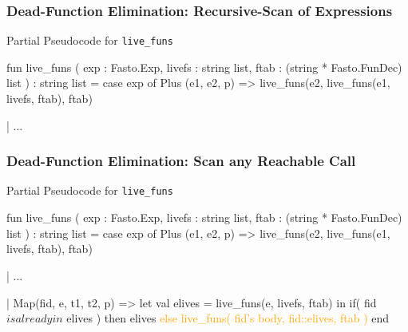 \documentclass{beamer}
\newcommand{\orange}[1]{\textcolor{Orange}{{#1}}}
\renewcommand{\emph}[1]{\textcolor{structure}{#1}}
\newcommand{\emp}[1]{\textcolor{DikuRed}{ #1}}
\newcommand{\mymath}[1]{$ #1 $}
\begin{document}
\begin{frame}[fragile,t]
    \frametitle{Dead-Function Elimination: Recursive-Scan of Expressions}

\begin{block}{Partial Pseudocode for {\tt live\_funs}}
\begin{colorcode}[fontsize=\scriptsize]
fun live_funs (
          exp    : Fasto.Exp,
          livefs : string list,
          ftab   : (string * Fasto.FunDec) list
    ) : string list =
  case exp of
    Plus (e1, e2, p) =>
        \emph{live_funs(e2, live_funs(e1, livefs, ftab), ftab)}

  | ...

\end{colorcode} 
\end{block}

\end{frame}




\begin{frame}[fragile,t]
    \frametitle{Dead-Function Elimination: Scan any Reachable Call}

\begin{block}{Partial Pseudocode for {\tt live\_funs}}
\begin{colorcode}[fontsize=\scriptsize]
fun live_funs (
          exp    : Fasto.Exp,
          livefs : string list,
          ftab   : (string * Fasto.FunDec) list
    ) : string list =
  case exp of
    Plus (e1, e2, p) =>
        \emph{live_funs(e2, live_funs(e1, livefs, ftab), ftab)}

  | ...

  | Map(fid, e, t1, t2, p) =>
        let val \emph{elives = live_funs(e, livefs, ftab)}
        in  \emp{if( fid \mymath{is already in} elives ) then elives}
            \orange{else live_funs( fid's body, fid::elives, ftab )}
        end
\end{colorcode} 
\end{block}

\end{frame}
\end{document}
